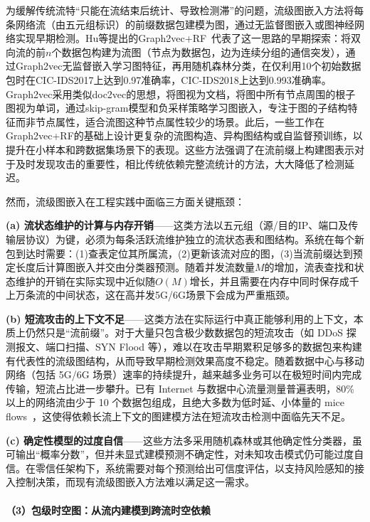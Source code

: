 为缓解传统流特``只能在流结束后统计、导致检测滞''的问题，流级图嵌入方法将每条网络流（由五元组标识）的前缀数据包建模为图，通过无监督图嵌入或图神经网络实现早期检测。Hu等提出的Graph2vec+RF~\cite{Graph2vec+RF}代表了这一思路的早期探索：将双向流的前$n$个数据包构建为流图（节点为数据包，边为连续分组的通信突发），通过Graph2vec无监督嵌入学习图特征，再用随机森林分类，在仅利用10个初始数据包时在CIC-IDS2017上达到0.97准确率，CIC-IDS2018上达到0.993准确率。Graph2vec采用类似doc2vec的思想，将图视为文档，将图中所有节点周围的根子图视为单词，通过skip-gram模型和负采样策略学习图嵌入，专注于图的子结构特征而非节点属性，适合流图这种节点属性较少的场景。此后，一些工作在Graph2vec+RF的基础上设计更复杂的流图构造、异构图结构或自监督预训练，以提升在小样本和跨数据集场景下的表现。这些方法强调了在流前缀上构建图表示对于及时发现攻击的重要性，相比传统依赖完整流统计的方法，大大降低了检测延迟。

然而，流级图嵌入在工程实践中面临三方面关键瓶颈：

\textbf{(a) 流状态维护的计算与内存开销}——这类方法以五元组（源/目的IP、端口及传输层协议）为键，必须为每条活跃流维护独立的流状态表和图结构。系统在每个新包到达时需要：(1)查表定位其所属流，(2)更新该流对应的图，(3)当流前缀达到预定长度后计算图嵌入并交由分类器预测。随着并发流数量$M$的增加，流表查找和状态维护的开销在实际实现中近似随$O(M)$增长，并且需要在内存中同时保存成千上万条流的中间状态，这在高并发5G/6G场景下会成为严重瓶颈。

\textbf{(b) 短流攻击的上下文不足}——这类方法在实际运行中真正能够利用的上下文，本质上仍然只是``流前缀''。对于大量只包含极少数数据包的短流攻击（如 DDoS 探测报文、端口扫描、SYN Flood 等），难以在攻击早期累积足够多的数据包来构建有代表性的流级图结构，从而导致早期检测效果高度不稳定。随着数据中心与移动网络（包括 5G/6G 场景）速率的持续提升，越来越多业务可以在极短时间内完成传输，短流占比进一步攀升。已有 Internet 与数据中心流量测量普遍表明，80\% 以上的网络流由少于 10 个数据包组成，且绝大多数为低时延、小体量的 mice flows~\cite{Pekar2021}，这使得依赖长流上下文的图建模方法在短流攻击检测中面临先天不足。


\textbf{(c) 确定性模型的过度自信}——这些方法多采用随机森林或其他确定性分类器，虽可输出``概率分数''，但并未显式建模预测不确定性，对未知攻击模式仍可能过度自信。在零信任架构下，系统需要对每个预测给出可信度评估，以支持风险感知的接入控制决策，而现有流级图嵌入方法难以满足这一需求。

\paragraph{（3）包级时空图：从流内建模到跨流时空依赖}


